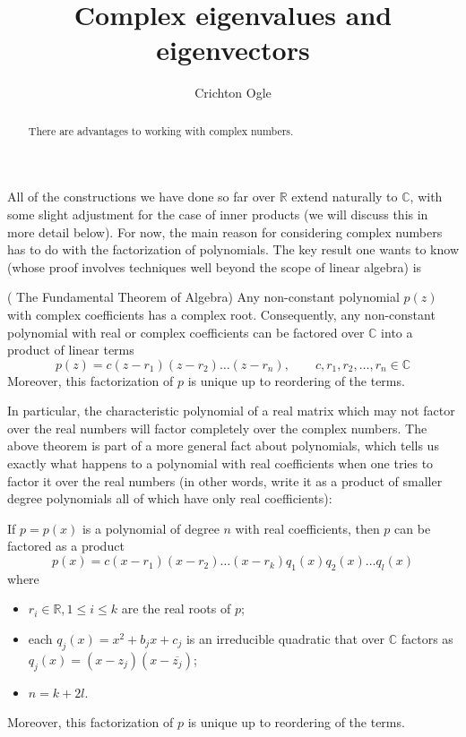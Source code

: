 \documentclass{ximera}
\title{Complex eigenvalues and eigenvectors}
\author{Crichton Ogle}
\begin{document}
\begin{abstract}
  There are advantages to working with complex numbers.
\end{abstract}
\maketitle

All of the constructions we have done so far over $\mathbb R$ extend naturally to $\mathbb C$, with some slight adjustment for the case of inner products (we will discuss this in more detail below). For now, the main reason for considering complex numbers has to do with the factorization of polynomials. The key result one wants to know (whose proof involves techniques well beyond the scope of linear algebra) is

\begin{theorem} {\rm ( The Fundamental Theorem of Algebra)} Any non-constant polynomial $p(z)$ with complex coefficients has a complex root. Consequently, any non-constant polynomial with real or complex coefficients can be factored over $\mathbb C$ into a product of linear terms
\[
p(z) = c(z - r_1)(z - r_2)\dots (z - r_n),\qquad c,r_1,r_2,\dots,r_n\in\mathbb C
\]
Moreover, this factorization of $p$ is unique up to reordering of the terms.
\end{theorem}

In particular, the characteristic polynomial of a real matrix which may not factor over the real numbers will factor completely over the complex numbers. The above theorem is part of a more general fact about polynomials, which tells us exactly what happens to a polynomial with real coefficients when one tries to factor it over the real numbers (in other words, write it as a product of smaller degree polynomials all of which have only real coefficients):

\begin{theorem} If $p = p(x)$ is a polynomial of degree $n$ with real coefficients, then $p$ can be factored as a product
\[
p(x) = c(x - r_1)(x - r_2)\dots (x - r_k)q_1(x)q_2(x)\dots q_l(x)
\]
where 
\begin{itemize}
\item $r_i\in\mathbb R, 1\le i\le k$ are the real roots of $p$;
\item each $q_j(x) = x^2 + b_jx + c_j$ is an irreducible quadratic that over $\mathbb C$ factors as $q_j(x) = (x - z_j)(x - \overline{z_j})$;
\item $n = k + 2l$.
\end{itemize}
Moreover, this factorization of $p$ is unique up to reordering of the terms.
\end{theorem}
\end{document}
